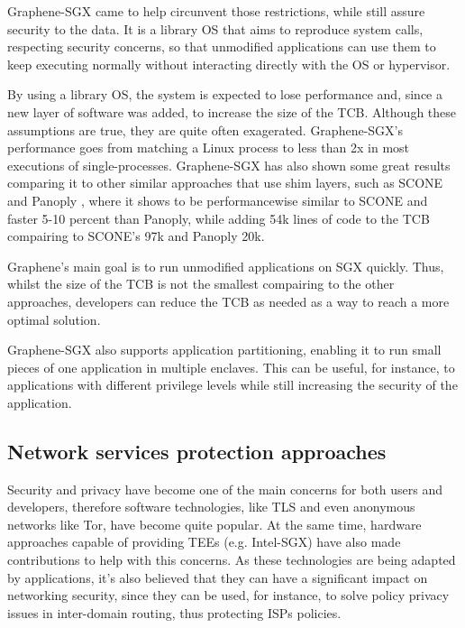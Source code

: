 Graphene-SGX \cite{graphenePaper} came to help circunvent those restrictions, while still assure security to the data. It is a library OS that aims to reproduce system calls, respecting security concerns, so that unmodified applications can use them to keep executing normally without interacting directly with the OS or hypervisor. 

By using a library OS, the system is expected to lose performance and, since a new layer of software was added, to increase the size of the TCB. 
Although these assumptions are true, they are quite often exagerated. Graphene-SGX's performance goes from matching a Linux process to less than 2x in most executions of single-processes.
Graphene-SGX has also shown some great results comparing it to other similar approaches that use shim layers, such as SCONE \cite{sconePaper} and Panoply \cite{panoplyPaper}, where it shows to be performancewise similar to SCONE and faster 5-10 percent than Panoply, while adding 54k lines of code to the TCB compairing to SCONE's 97k and Panoply 20k.

Graphene's main goal is to run unmodified applications on SGX quickly. Thus, whilst the size of the TCB is not the smallest compairing to the other approaches, developers can reduce the TCB as needed as a way to reach a more optimal solution. 

Graphene-SGX also supports application partitioning, enabling it to run small pieces of one application in multiple enclaves. This can be useful, for instance, to applications with different privilege levels while still increasing the security of the application.

\subsection{Network services protection approaches}
\label{ssec:sgx_network_frameworks}

Security and privacy have become one of the main concerns for both users and developers, therefore software technologies, like TLS and even anonymous networks like Tor, have become quite popular. At the same time, hardware approaches capable of providing TEEs (e.g. Intel-SGX) have also made contributions to help with this concerns. 
As these technologies are being adapted by applications, it's also believed that they can have a significant impact on networking security, since they can be used, for instance, to solve policy privacy issues in inter-domain routing, thus protecting ISPs policies. 

